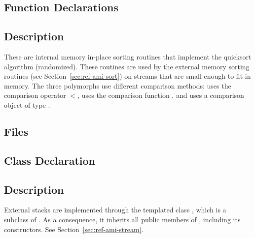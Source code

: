 \subsection{Function Declarations}

  \btabb
      {}

      {}

      {}
  \etabb

\subsection{Description}

These are internal memory in-place sorting routines that implement the
quicksort algorithm (randomized).  These routines are used by the external
memory sorting routines (see Section~\ref{sec:ref-ami-sort}) on streams
that are small enough to fit in memory.
The three polymorphs use different comparison methods:
 uses the comparison operator $<$,
 uses the comparison function , and
 uses a comparison object of type .


\subsection{Files}
  \btabb
	 {}
  \etabb

\subsection{Class Declaration}
   \btabb
	 {}
   \etabb

\subsection{Description}
External stacks are implemented through the templated class
, 
which is a subclass of . As a consequence, it
inherits all public members of , including its
constructors. See Section~\ref{sec:ref-ami-stream}.

